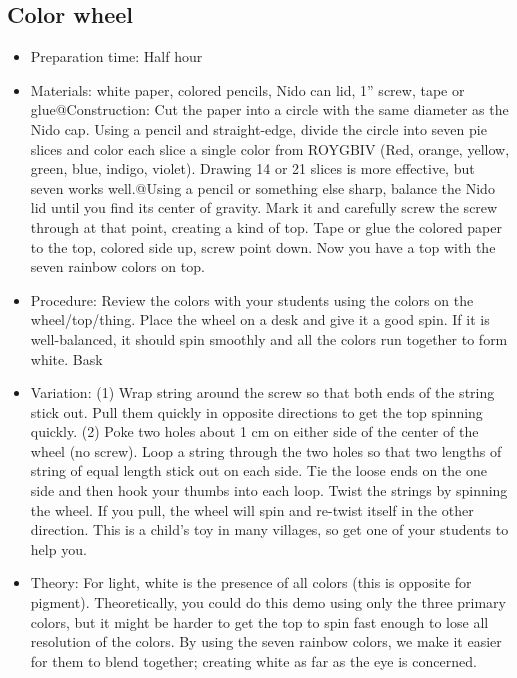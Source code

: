 \subsection{Color wheel}
\begin{itemize}
\item{Preparation time: Half hour}
\item{Materials: white paper, colored pencils, Nido can lid, 1” screw, tape or glue@Construction: Cut the paper into a circle with the same diameter as the Nido cap. Using a pencil and straight-edge, divide the circle into seven pie slices and color each slice a single color from ROYGBIV (Red, orange, yellow, green, blue, indigo, violet). Drawing 14 or 21 slices is more effective, but seven works well.@Using a pencil or something else sharp, balance the Nido lid until you find its center of gravity. Mark it and carefully screw the screw through at that point, creating a kind of top. Tape or glue the colored paper to the top, colored side up, screw point down. Now you have a top with the seven rainbow colors on top.}
\item{Procedure: Review the colors with your students using the colors on the wheel/top/thing. Place the wheel on a desk and give it a good spin. If it is well-balanced, it should spin smoothly and all the colors run together to form white. Bask }
\item{Variation: (1) Wrap string around the screw so that both ends of the string stick out. Pull them quickly in opposite directions to get the top spinning quickly. (2) Poke two holes about 1 cm on either side of the center of the wheel (no screw). Loop a string through the two holes so that two lengths of string of equal length stick out on each side. Tie the loose ends on the one side and then hook your thumbs into each loop. Twist the strings by spinning the wheel. If you pull, the wheel will spin and re-twist itself in the other direction. This is a child’s toy in many villages, so get one of your students to help you.}
\item{Theory: For light, white is the presence of all colors (this is opposite for pigment). Theoretically, you could do this demo using only the three primary colors, but it might be harder to get the top to spin fast enough to lose all resolution of the colors. By using the seven rainbow colors, we make it easier for them to blend together; creating white as far as the eye is concerned.}
\end{itemize}

